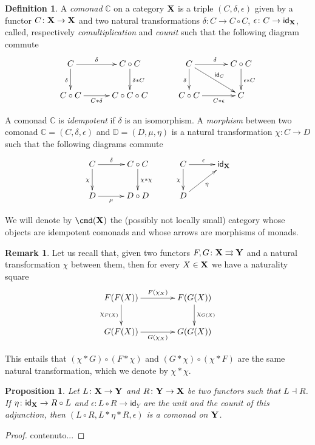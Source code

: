 \documentclass[a4paper]{article}
\newcommand{\id}[1]{\mathsf{id}_{#1}}
\def\X{\textbf {\textup{X}}}
\def\Y{\textbf {\textup{Y}}}
\newcommand{\m}[1]{\mathbb{#1}}
\newtheorem{proposition}[theorem]{Proposition}
\theoremstyle{definition}
\newtheorem{definition}[theorem]{Definition}
\newtheorem{remark}[theorem]{Remark}
\begin{document}
 \iffalse 
\begin{definition}
	A \emph{comonad} $\m{C}$ on a category $\X$ is a triple $(C, \delta, \epsilon)$ given by a functor $C\colon \X\to \X$ and two natural transformations $\delta\colon C\to C\circ C $, $\epsilon\colon C\to \id{\X}$, called, respectively \emph{comultiplication} and \emph{counit} such that the following diagram commute
	\[\xymatrix@C=30pt{C \ar[d]_{\delta}\ar[r]^-{\delta}& C\circ C  \ar[d]^{\delta*C}&  C \ar[d]_{\delta}\ar[r]^{\delta} \ar[dr]^-{\id{C}} & C\circ C \ar[d]^{\epsilon *C}\\ C\circ C \ar[r]_-{C*\delta}& C\circ C\circ C & C\circ C \ar[r]_-{C*\epsilon} & C}\]
	
	A comonad $\m{C}$ is \emph{idempotent} if $\delta$ is an isomorphism.  A \emph{morphism} between two comonad $\m{C}=(C, \delta, \epsilon)$ and $\m{D}=(D, \mu, \eta)$ is a natural transformation $\chi\colon C\to D$ such that the following diagrams commute
	\[\xymatrix@C=30pt{ C \ar[r]^-{\delta} \ar[d]_{\chi} & C\circ C \ar[d]^{\chi*\chi}& C \ar[r]^{\epsilon} \ar[d]_{\chi}& 
\id{\X}  \\ D \ar[r]_-{\mu} & D\circ D
	& D \ar[ur]_{\eta} }\]	
	
	We will denote by $\cmd(\X)$ the (possibly not locally small) category whose objects are idempotent comonads and whose arrows are morphisms of monads.
\end{definition}

\begin{remark} Let us recall that, given two functors $F, G\colon \X\rightrightarrows \Y$ and a natural transformation $\chi$ between them, then for every $X\in \X$ we have a naturality square
		\[\xymatrix@C=40pt{F(F(X)) \ar[r]^{F(\chi_X)} \ar[d]_{\chi_{F(X)}}& F(G(X)) \ar[d]^{\chi_{G(X)}}\\G(F(X)) \ar[r]_{G(\chi_X)} & G(G(X))}\]
	
	This entails that $(\chi * G)\circ (F*\chi)$ and $(G*\chi) \circ (\chi* F)$ are the same natural transformation, which we denote by $\chi*\chi$.
\end{remark}


\begin{proposition}
Let $L\colon \X \to \Y$ and $R\colon \Y \to \X$ be two functors such that $L\dashv R$. If $\eta \colon \id{\X}\to R\circ L$ and $\epsilon\colon L\circ R \to \id{Y}$ are the unit and the counit of this adjunction, then $(L\circ R, L*\eta *R ,\epsilon)$ is a comonad on $\Y$.
\end{proposition}
\begin{proof}
	contenuto...
\end{proof}
\end{document}
